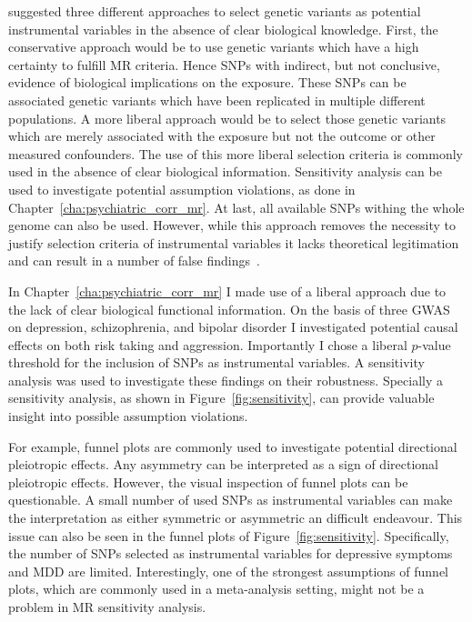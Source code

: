 \citet{Burgess2016a} suggested three different approaches to select genetic variants as potential instrumental  variables in the absence of clear biological knowledge.
First, the conservative approach would be to use genetic variants which have a high certainty to fulfill MR criteria.
Hence SNPs with indirect, but not conclusive, evidence of biological implications on the exposure.
These SNPs can be associated genetic variants which have been replicated in multiple different populations.
A more liberal approach would be to select those genetic variants which are merely associated with the exposure but not the outcome or other measured confounders.
The use of this more liberal selection criteria is commonly used in the absence of clear biological information.
Sensitivity analysis can be used to investigate potential assumption violations, as done in Chapter~\ref{cha:psychiatric_corr_mr}.
At last, all available SNPs withing the whole genome can also be used.
However, while this approach removes the necessity to justify  selection criteria of instrumental variables it lacks theoretical legitimation~\cite{Burgess2016a} and can result in a number of false findings~\cite{Evans2013}.

In Chapter~\ref{cha:psychiatric_corr_mr} I made use of a liberal approach due to the lack of clear biological functional information.
On the basis of three GWAS on depression, schizophrenia, and bipolar disorder I investigated potential causal effects on both risk taking and aggression.
Importantly I chose a liberal $p$-value threshold for the inclusion of SNPs as instrumental variables.
A sensitivity analysis was used to investigate these findings on their robustness.
Specially a sensitivity analysis, as shown in Figure~\ref{fig:sensitivity}, can provide valuable insight into possible assumption violations.

For example, funnel plots are commonly used to investigate potential directional pleiotropic effects.
Any asymmetry can be interpreted as a sign of directional pleiotropic effects.
However, the visual inspection of funnel plots can be questionable.
A small number of used SNPs as instrumental variables can make the interpretation as either symmetric or asymmetric an difficult endeavour. 
This issue can also be seen in the funnel plots of Figure~\ref{fig:sensitivity}.
Specifically, the number of SNPs selected as instrumental variables for depressive symptoms and MDD are limited. 
Interestingly, one of the strongest assumptions of funnel plots, which are commonly used in a meta-analysis setting, might not be a problem in MR sensitivity analysis.


